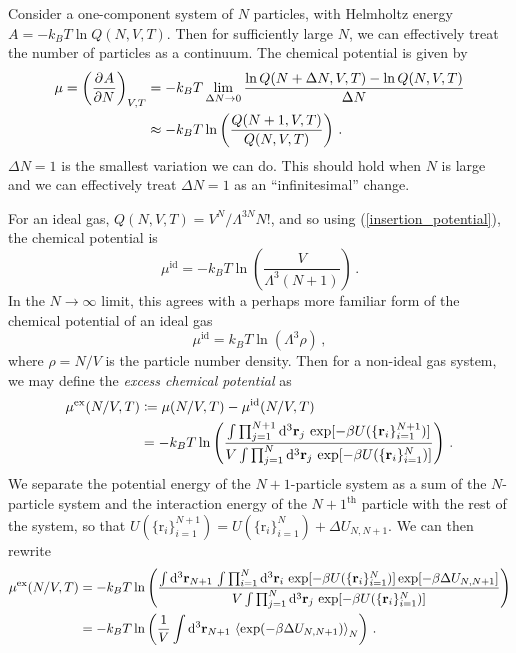 \documentclass{article}
\theoremstyle{plain}\theoremheaderfont{\normalfont\bfseries}\theorembodyfont{\rmfamily}\theoremseparator{.}\newtheorem*{thm}{Theorem}\newtheorem*{law}{Law}\newtheorem*{pos}{Postulate}
\numberwithin{equation}{section}
\newcommand{\dd}[2][]{\mathrm{d}^{#1} #2\,}
\newcommand{\pdv}[3][]{\frac{\partial^{#1} #2}{{\partial #3}^{#1}}}
\newcommand{\eval}[1]{\left\langle #1 \right\rangle}
\newcommand{\vb}[1]{\bm{\mathrm{#1}}}
\begin{document}
    Consider a one-component system of \(N\) particles, with Helmholtz energy \(A=-k_B T\ln Q(N,V,T)\). Then for sufficiently large \(N\), we can effectively treat the number of particles as a continuum. The chemical potential is given by
    \begin{align}\label{insertion_potential}
        \mu=\left(\pdv{A}{N}\right)_{V,T}&= -k_B T\lim_{\Delta N\to 0}\frac{\ln Q(N+\Delta N,V,T)-\ln Q(N,V,T)}{\Delta N}\notag \\
        &\approx -k_B T\ln\left(\frac{Q(N+1,V,T)}{Q(N,V,T)}\right)\,.
    \end{align}
    \(\Delta N=1\) is the smallest variation we can do. This should hold when \(N\) is large and we can effectively treat \(\Delta N=1\) as an ``infinitesimal'' change.

    For an ideal gas, \(Q(N,V,T)=V^N/\Lambda^{3N}N!\), and so using (\ref{insertion_potential}), the chemical potential is
    \begin{equation}
        \mu^{\text{id}}=-k_B T\ln\left(\frac{V}{\Lambda^3(N+1)}\right)\,.
    \end{equation}
    In the \(N\to\infty\) limit, this agrees with a perhaps more familiar form of the chemical potential of an ideal gas
    \begin{equation}
        \mu^{\text{id}}=k_B T\ln(\Lambda^3\rho)\,,
    \end{equation}
    where \(\rho=N/V\) is the particle number density. Then for a non-ideal gas system, we may define the \textit{excess chemical potential} as
    \begin{align}
        \mu^{\text{ex}}(N/V,T)&\coloneqq\mu(N/V,T)-\mu^{\text{id}}(N/V,T)\notag\\
        &=-k_B T\ln\left(\frac{\int\prod_{j=1}^{N+1}\dd[3]{\vb{r}_j}\exp[-\beta U(\{\vb{r}_i\}_{i=1}^{N+1})]}{V\int\prod_{j=1}^{N}\dd[3]{\vb{r}_j}\exp[-\beta U(\{\vb{r}_i\}_{i=1}^{N})]}\right)\,.
    \end{align}
    We separate the potential energy of the \(N+1\)-particle system as a sum of the \(N\)-particle system and the interaction energy of the \(N+1^{\text{th}}\) particle with the rest of the system, so that \(U(\{\vb{r}_i\}_{i=1}^{N+1})=U(\{\vb{r}_i\}_{i=1}^{N})+\Delta U_{N,N+1}\). We can then rewrite
    \begin{align}
        \mu^{\text{ex}}(N/V,T)&=-k_B T\ln\left(\frac{\int\dd[3]{\vb{r}_{N+1}}\int\prod_{i=1}^{N}\dd[3]{\vb{r}_i}\exp[-\beta U(\{\vb{r}_i\}_{i=1}^{N})]\exp[-\beta\Delta U_{N,N+1}]}{V\int\prod_{j=1}^{N}\dd[3]{\vb{r}_j}\exp[-\beta U(\{\vb{r}_i\}_{i=1}^{N})]}\right)\notag\\
        &=-k_B T\ln\left(\frac{1}{V}\int\dd[3]{\vb{r}_{N+1}}\eval{\exp(-\beta\Delta U_{N,N+1})}_N\right)\,.
    \end{align}
\end{document}
